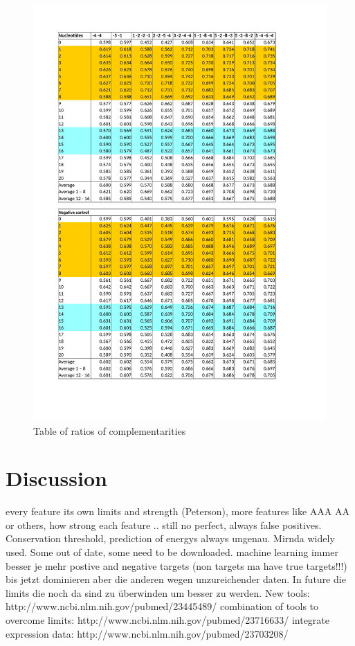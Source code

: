 \documentclass[12pt]{article}
\begin{document}
\begin{figure}
\vspace{-3cm}
\includegraphics[scale=0.8]{results/ratio_table.pdf}
\vspace{-2.8cm}
\caption{Table of ratios of complementarities}
\label{table:ratios}
\end{figure}



\section{Discussion}
every feature its own limits and strength (Peterson), more features like AAA AA or others, how strong each feature .. still no perfect, always false positives. Conservation threshold, prediction of energys always ungenau. Mirnda widely used. Some out of date, some need to be downloaded. machine learning immer besser je mehr postive and negative targets (non targets ma have true targets!!!) bis jetzt dominieren aber die anderen wegen unzureichender daten. In future die limits die noch da sind zu überwinden um besser zu werden.
New tools: http://www.ncbi.nlm.nih.gov/pubmed/23445489/
combination of tools to overcome limits: http://www.ncbi.nlm.nih.gov/pubmed/23716633/
integrate expression data: http://www.ncbi.nlm.nih.gov/pubmed/23703208/
\end{document}
